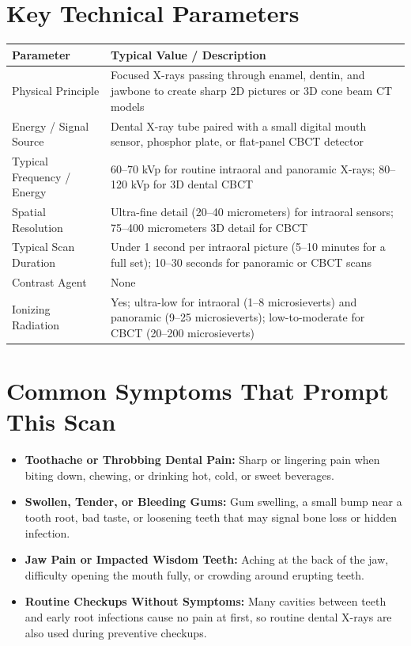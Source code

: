 \section{Key Technical Parameters}
\noindent
\begin{tabularx}{\textwidth}{@{}l X@{}}
\toprule
\textbf{Parameter} & \textbf{Typical Value / Description} \\
\midrule
Physical Principle & Focused X-rays passing through enamel, dentin, and jawbone to create sharp 2D pictures or 3D cone beam CT models \\
Energy / Signal Source & Dental X-ray tube paired with a small digital mouth sensor, phosphor plate, or flat-panel CBCT detector \\
Typical Frequency / Energy & 60--70 kVp for routine intraoral and panoramic X-rays; 80--120 kVp for 3D dental CBCT \\
Spatial Resolution & Ultra-fine detail (20--40 micrometers) for intraoral sensors; 75--400 micrometers 3D detail for CBCT \\
Typical Scan Duration & Under 1 second per intraoral picture (5--10 minutes for a full set); 10--30 seconds for panoramic or CBCT scans \\
Contrast Agent & None \\
Ionizing Radiation & Yes; ultra-low for intraoral (1--8 microsieverts) and panoramic (9--25 microsieverts); low-to-moderate for CBCT (20--200 microsieverts) \\
\bottomrule
\end{tabularx}

\section{Common Symptoms That Prompt This Scan}
\begin{itemize}
\item \textbf{Toothache or Throbbing Dental Pain:} Sharp or lingering pain when biting down, chewing, or drinking hot, cold, or sweet beverages.
\item \textbf{Swollen, Tender, or Bleeding Gums:} Gum swelling, a small bump near a tooth root, bad taste, or loosening teeth that may signal bone loss or hidden infection.
\item \textbf{Jaw Pain or Impacted Wisdom Teeth:} Aching at the back of the jaw, difficulty opening the mouth fully, or crowding around erupting teeth.
\item \textbf{Routine Checkups Without Symptoms:} Many cavities between teeth and early root infections cause no pain at first, so routine dental X-rays are also used during preventive checkups.
\end{itemize}

